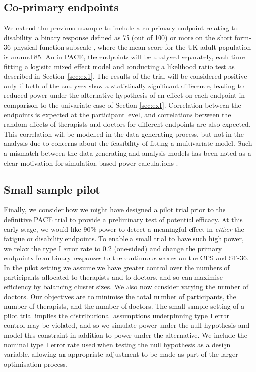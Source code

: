 \documentclass{article}
\begin{document}
\subsection{Co-primary endpoints}\label{sec:ex2}

We extend the previous example to include a co-primary endpoint relating to disability, a binary response defined as 75 (out of 100) or more on the short form-36 physical function subscale \cite{McHorney1993}, where the mean score for the UK adult population is around 85. An in PACE, the endpoints will be analysed separately, each time fitting a logisitc mixed effect model and conducting a likelihood ratio test as described in Section~\ref{sec:ex1}. The results of the trial will be considered positive only if both of the analyses show a statistically significant difference, leading to reduced power under the alternative hypothesis of an effect on each endpoint in comparison to the univariate case of Section \ref{sec:ex1}\cite{Senn2007}. Correlation between the endpoints is expected at the participant level, and correlations between the random effects of therapists and doctors for different endpoints are also expected. This correlation will be modelled in the data generating process, but not in the analysis due to concerns about the feasibility of fitting a multivariate model. Such a mismatch between the data generating and analysis models has been noted as a clear motivation for simulation-based power calculations \cite{Landau2013}.

\subsection{Small sample pilot}\label{sec:ex3}

Finally, we consider how we might have designed a pilot trial prior to the definitive PACE trial to provide a preliminary test of potential efficacy. At this early stage, we would like 90\% power to detect a meaningful effect in \emph{either} the fatigue or disability endpoints. To enable a small trial to have such high power, we relax the type I error rate to 0.2 (one-sided) and change the primary endpoints from binary responses to the continuous scores on the CFS and SF-36. In the pilot setting we assume we have greater control over the numbers of participants allocated to therapists and to doctors, and so can maximise efficiency by balancing cluster sizes. We also now consider varying the number of doctors.  Our objectives are to minimise the total number of participants, the number of therapists, and the number of doctors. The small sample setting of a pilot trial implies the distributional assumptions underpinning type I error control may be violated, and so we simulate power under the null hypothesis and model this constraint in addition to power under the alternative. We include the nominal type I error rate used when testing the null hypothesis as a design variable, allowing an appropriate adjustment to be made as part of the larger optimisation process.
 
\end{document}
